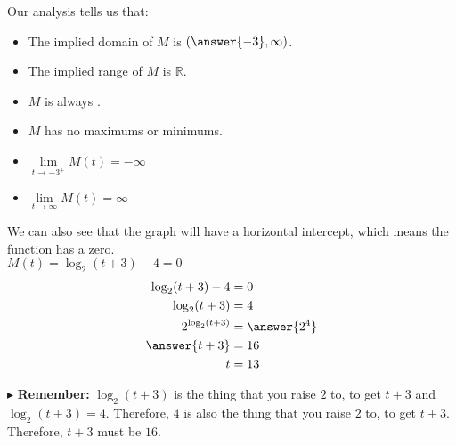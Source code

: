 \documentclass{ximera}
\begin{document}
\begin{example}
\begin{explanation}
\begin{image}
\end{image}




Our analysis tells us that:

\begin{itemize}
\item The implied domain of $M$ is $\left( \answer{-3} ,\infty \right)$.
\item The implied range of $M$ is $\mathbb{R}$.
\item $M$ is always  .
\item $M$ has no maximums or minimums.
\item $\lim\limits_{t \to -3^+} M(t) = -\infty$
\item $\lim\limits_{t \to \infty} M(t) = \infty$
\end{itemize}




We can also see that the graph will have a horizontal intercept, which means the function has a zero. \\


$M(t) = \log_2(t+3) - 4 = 0$ \\


\begin{align*}
\log_2(t+3) - 4 & = 0 \\
\log_2(t+3) & = 4 \\
2^{\log_2(t+3)} & = \answer{2^4} \\
\answer{t+3} & = 16 \\
t & = 13
\end{align*}


$\blacktriangleright$ \textbf{Remember:} $\log_2(t+3)$ is the thing that you raise $2$ to, to get $t+3$ and $\log_2(t+3) = 4$.  Therefore, $4$ is also the thing that you raise $2$ to, to get $t+3$. Therefore, $t+3$ must be $16$.









\end{explanation}

\end{example}
\end{document}
